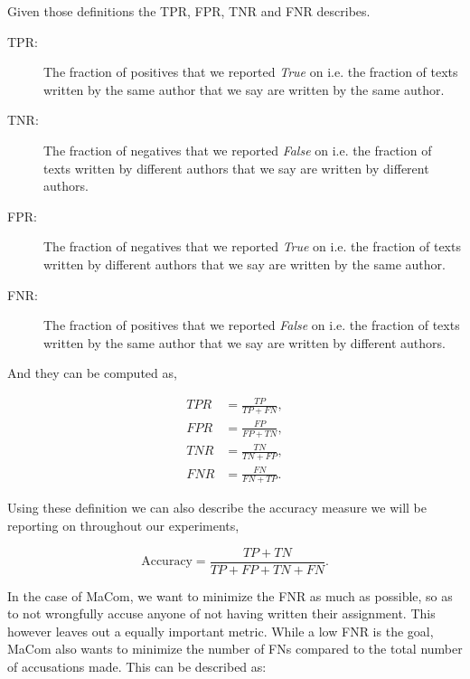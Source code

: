 Given those definitions the \gls{TPR}, \gls{FPR}, \gls{TNR} and \gls{FNR}
describes.

\begin{description}
    \item[\gls{TPR}: ]

        The fraction of positives that we reported \textit{True} on i.e. the
        fraction of texts written by the same author that we say are written by
        the same author.

    \item[\gls{TNR}: ]

        The fraction of negatives that we reported \textit{False} on i.e. the
        fraction of texts written by different authors that we say are written
        by different authors.

    \item[\gls{FPR}: ]

        The fraction of negatives that we reported \textit{True} on i.e. the
        fraction of texts written by different authors that we say are written
        by the same author.

    \item[\gls{FNR}: ]

        The fraction of positives that we reported \textit{False} on i.e. the
        fraction of texts written by the same author that we say are written by
        different authors.

\end{description}

And they can be computed as,

\begin{align}
    TPR &= \frac{TP}{TP + FN}, \\
    FPR &= \frac{FP}{FP + TN}, \\
    TNR &= \frac{TN}{TN + FP}, \\
    FNR &= \frac{FN}{FN + TP}.
\end{align}

Using these definition we can also describe the accuracy measure we will be
reporting on throughout our experiments,

\begin{equation}
    \text{Accuracy} = \frac{TP + TN}{TP + FP + TN + FN}.
\end{equation}

In the case of MaCom, we want to minimize the \gls{FNR} as much as possible,
so as to not wrongfully accuse anyone of not having written their assignment.
This however leaves out a equally important metric. While a low \gls{FNR} is
the goal, MaCom also wants to minimize the number of \glspl{FN} compared to the
total number of accusations made. This can be described as:

